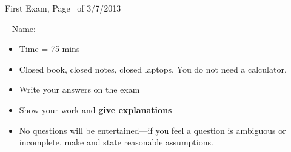 \documentclass[11pt]{exam}
\begin{document}
\pagestyle{headandfoot}
\runningheadrule
{}
{First Exam, Page \thepage\ of \numpages}
{3/7/2013}
\firstpagefooter{}{}{}

\title{}

\author{}
\date{}
\addpoints
\pointsinmargin
{}


\newcommand{\rb}[1]{\raisebox{1.5ex}[0pt]{#1}}

\large
\mbox{ }
\vfill
{\LARGE {Name:}}
\vspace{0.2in}

\begin{itemize}
\item Time = 75 mins
\item Closed book, closed notes, closed laptops.  You do not need a calculator.
\item Write your answers on the exam
\item Show your work and {\bf give explanations}
\item No questions will be entertained---if you feel
a question is ambiguous or incomplete, make and state
reasonable assumptions.
\end{itemize}
\vfill

{\Large
\begin{center}
\pointtable[h][questions]
\end{center}
}

\vfill
\vfill

\newpage
\end{document}
